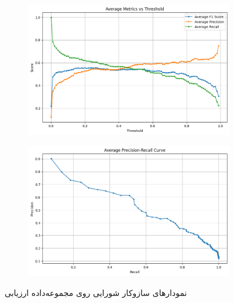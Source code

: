 \begin{figure}[h!]
		\centering %
		\begin{subfigure}{0.45\textwidth}
			\includegraphics[width=\linewidth]{Images/Chapter3/metrics-cls.png}
			\caption{}
			
			\label{fig:ch3-metrics-cls}
		\end{subfigure}\hfil %
		\begin{subfigure}{0.45\textwidth}
			\includegraphics[width=\linewidth]{Images/Chapter3/pr-cls.png}
			\caption{}
			\label{fig:ch3-pr-cls}
		\end{subfigure}\hfil %
		\caption{نمودارهای سازوکار شورایی روی مجموعه‌داده ارزیابی}
		\label{fig:ch3-metrics and pr cls}
\end{figure}


